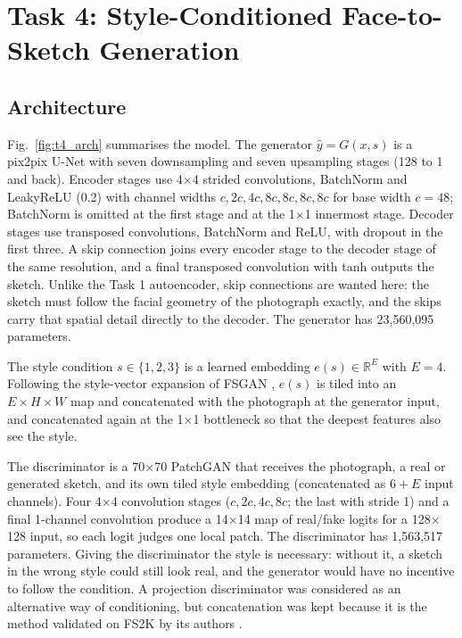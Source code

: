 \documentclass[conference]{IEEEtran}
\begin{document}
\section{Task 4: Style-Conditioned Face-to-Sketch Generation}

\subsection{Architecture}
Fig.~\ref{fig:t4_arch} summarises the model. The generator $\hat{y} = G(x, s)$ is a pix2pix U-Net \cite{isola2017,ronneberger2015} with seven downsampling and seven upsampling stages (128 to 1 and back). Encoder stages use 4$\times$4 strided convolutions, BatchNorm and LeakyReLU (0.2) with channel widths $c, 2c, 4c, 8c, 8c, 8c, 8c$ for base width $c = 48$; BatchNorm is omitted at the first stage and at the 1$\times$1 innermost stage. Decoder stages use transposed convolutions, BatchNorm and ReLU, with dropout in the first three. A skip connection joins every encoder stage to the decoder stage of the same resolution, and a final transposed convolution with tanh outputs the sketch. Unlike the Task 1 autoencoder, skip connections are wanted here: the sketch must follow the facial geometry of the photograph exactly, and the skips carry that spatial detail directly to the decoder. The generator has 23,560,095 parameters.

The style condition $s \in \{1,2,3\}$ is a learned embedding $e(s) \in \mathbb{R}^{E}$ with $E = 4$. Following the style-vector expansion of FSGAN \cite{fan2022}, $e(s)$ is tiled into an $E \times H \times W$ map and concatenated with the photograph at the generator input, and concatenated again at the 1$\times$1 bottleneck so that the deepest features also see the style.

The discriminator is a 70$\times$70 PatchGAN \cite{isola2017} that receives the photograph, a real or generated sketch, and its own tiled style embedding (concatenated as $6 + E$ input channels). Four 4$\times$4 convolution stages ($c, 2c, 4c, 8c$; the last with stride 1) and a final 1-channel convolution produce a 14$\times$14 map of real/fake logits for a 128$\times$128 input, so each logit judges one local patch. The discriminator has 1,563,517 parameters. Giving the discriminator the style is necessary: without it, a sketch in the wrong style could still look real, and the generator would have no incentive to follow the condition. A projection discriminator \cite{miyato2018proj} was considered as an alternative way of conditioning, but concatenation was kept because it is the method validated on FS2K by its authors \cite{fan2022}.
\end{document}
